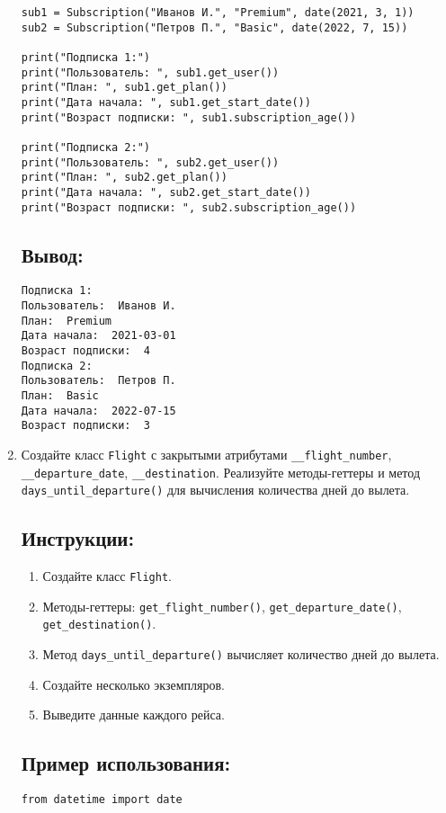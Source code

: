 \begin{enumerate}
\begin{lstlisting}[caption=Пример кода]
sub1 = Subscription("Иванов И.", "Premium", date(2021, 3, 1))
sub2 = Subscription("Петров П.", "Basic", date(2022, 7, 15))

print("Подписка 1:")
print("Пользователь: ", sub1.get_user())
print("План: ", sub1.get_plan())
print("Дата начала: ", sub1.get_start_date())
print("Возраст подписки: ", sub1.subscription_age())

print("Подписка 2:")
print("Пользователь: ", sub2.get_user())
print("План: ", sub2.get_plan())
print("Дата начала: ", sub2.get_start_date())
print("Возраст подписки: ", sub2.subscription_age())
\end{lstlisting}

\subsection*{Вывод:}
\begin{lstlisting}[caption=Ожидаемый вывод]
Подписка 1:
Пользователь:  Иванов И.
План:  Premium
Дата начала:  2021-03-01
Возраст подписки:  4
Подписка 2:
Пользователь:  Петров П.
План:  Basic
Дата начала:  2022-07-15
Возраст подписки:  3
\end{lstlisting}

\item
Создайте класс \texttt{Flight} с закрытыми атрибутами \texttt{\_\_flight\_number}, \texttt{\_\_departure\_date}, \texttt{\_\_destination}. Реализуйте методы-геттеры и метод \texttt{days\_until\_departure()} для вычисления количества дней до вылета.

\subsection*{Инструкции:}
\begin{enumerate}
    \item Создайте класс \texttt{Flight}.
    \item Методы-геттеры: \texttt{get\_flight\_number()}, \texttt{get\_departure\_date()}, \texttt{get\_destination()}.
    \item Метод \texttt{days\_until\_departure()} вычисляет количество дней до вылета.
    \item Создайте несколько экземпляров.
    \item Выведите данные каждого рейса.
\end{enumerate}

\subsection*{Пример использования:}
\begin{lstlisting}[caption=Пример кода]
from datetime import date


\end{lstlisting}
\end{enumerate}
